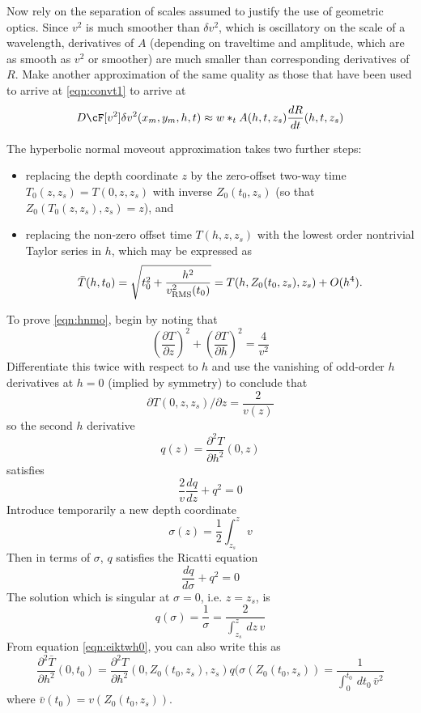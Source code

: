 Now rely on the separation of scales assumed to justify the use of geometric optics. Since $v^2$ is much smoother than $\delta v^2$, which is oscillatory on the scale of a wavelength, derivatives of $A$ (depending on traveltime and amplitude, which are as smooth as $v^2$ or smoother) are much smaller than corresponding derivatives of $R$. Make another approximation of the same quality as those that have been used to arrive at \ref{eqn:convt1} to arrive at
\begin{equation}
\label{eqn:convt}
D\cF[v^2]\delta v^2(x_m,y_m,h,t) \approx  w*_t A(h,t,z_s) \frac{dR}{dt}(h,t,z_s)
\end{equation}

The hyperbolic normal moveout approximation takes two further steps:
\begin{itemize}
\item replacing the depth coordinate $z$ by the zero-offset two-way time
$T_0(z,z_s) = T(0,z,z_s)$ with inverse $Z_0(t_0,z_s)$ (so that $Z_0(T_0(z,z_s),z_s) = z$), and 
\item replacing the non-zero offset time $T(h,z,z_s)$ with the lowest order nontrivial Taylor series in $h$, which may be expressed as
\begin{equation}
\label{eqn:hnmo}
\bar{T}(h,t_0) = \sqrt{t_0^2 + \frac{h^2}{v_{\rm RMS}^2(t_0)}} = T(h,Z_0(t_0,z_s),z_s)+ O(h^4).
\end{equation}
\end{itemize}
To prove \ref{eqn:hnmo}, begin by noting that
\begin{equation}
\label{eqn:eik2w}
\left(\frac{\partial T}{\partial z}\right)^2+
\left(\frac{\partial T}{\partial h}\right)^2 =\frac{4}{v^2}
\end{equation}
Differentiate this twice with respect to $h$ and use the vanishing of
odd-order $h$ derivatives at $h=0$ (implied by symmetry) to conclude
that 
\begin{equation}
\label{eqn:eiktwh0}
\partial T(0,z,z_s)/\partial z = \frac{2}{v(z)}
\end{equation}
so the second $h$ derivative
\[
q(z)=\frac{\partial^2 T}{\partial h^2}(0,z)
\]
satisfies
\[
\frac{2}{v}\frac{dq}{dz}+q^2=0
\]
Introduce temporarily a new depth coordinate
\[
\sigma(z)=\frac{1}{2}\int_{z_s}^z \, v
\]
Then in terms of $\sigma$, $q$ satisfies the Ricatti equation
\[
\frac{dq}{d\sigma}+q^2=0
\]
The solution which is singular at $\sigma=0$, i.e. $z=z_s$, is
\[
q(\sigma)=\frac{1}{\sigma}=\frac{2}{\int_{z_s}^z \,dz\,v}
\]
From equation \ref{eqn:eiktwh0}, you can also write this as
\[
\frac{\partial ^2\bar{T}}{\partial h^2}(0,t_0) = \frac{\partial^2 T}{\partial h^2}(0,Z_0(t_0,z_s),z_s)  q(\sigma(Z_0(t_0,z_s))=\frac{1}{\int_0^{t_0}\,dt_0\,\bar{v}^2}
\]
where $\bar{v}(t_0) = v(Z_0(t_0,z_s))$.

